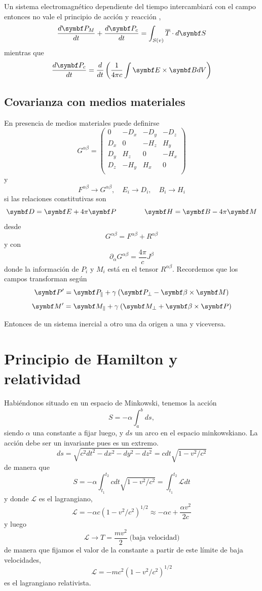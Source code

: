 \documentclass[10pt,oneside]{CBFT_book}
\begin{document}
Un sistema electromagnético dependiente del tiempo intercambiará  con el campo entonces no vale el
principio de acción y reacción ,
\[
	\dtot{\vb{P}_M}{t} + \dtot{\vb{P}_c}{t} = \int_{S(v)} \overline{T}\cdot d\vb{S}
\]
mientras que 
\[
	\dtot{\vb{P}_c}{t} = \dtot{}{t} \left( \frac{1}{4\pi c} \int \pv{E}{B} dV \right)
\]

\subsection{Covarianza con medios materiales}

En presencia de medios materiales puede definirse
\[
	G^{\alpha\beta} =
	\begin{pmatrix}
	 0 & -D_x & -D_y & -D_z \\
	 D_x & 0 & -H_z & H_y \\
	 D_y & H_z & 0 & -H_x \\
	 D_z & -H_y & H_x & 0 \\
	\end{pmatrix}
\]
y 
\[
	F^{\alpha\beta} \to G^{\alpha\beta}, \quad E_i \to D_i, \quad B_i \to H_i
\]
si las relaciones constitutivas son 
\[
	\vb{D} = \vb{E} + 4\pi\vb{P} \qquad\qquad \vb{H} = \vb{B} - 4\pi\vb{M}
\]
desde 
\[
	G^{\alpha\beta} = F^{\alpha\beta} + R^{\alpha\beta}
\]
y con 
\[
	\partial_\alpha G^{\alpha\beta} = \frac{4\pi}{c} J^\beta
\]
donde la información de $P_i$ y $M_i$ está en el tensor $R^{\alpha\beta}$.
Recordemos que los campos transforman según 
\[
	\vb{P}' = \vb{P}_\parallel + \gamma \: ( \vb{P}_\perp  - \pv{\beta}{M} )
\]
\[
	\vb{M}' = \vb{M}_\parallel + \gamma \: ( \vb{M}_\perp  + \pv{\beta}{P} )
\]

Entonces de un sistema inercial a otro una  da origen a una  y viceversa.

\section{Principio de Hamilton y relatividad}

Habiéndonos situado en un espacio de Minkowski, tenemos la acción
\[
	S = -\alpha \int_a^b ds,
\]
siendo $\alpha$ una constante a fijar luego, y $ds$ un arco en el espacio minkowskiano. La acción debe ser 
un invariante pues es un extremo.
\[
	ds = \sqrt{ c^2 dt^2 - dx^2 - dy^2 - dz^2 } = c dt \sqrt{ 1 - v^2/c^2 }
\]
de manera que 
\[
	S = -\alpha \int_{t_1}^{t_2} c dt  \sqrt{ 1 - v^2/c^2 } = \int_{t_1}^{t_2} \mathcal{L} dt
\]
y donde $\mathcal{L}$ es el lagrangiano, 
\[
	\mathcal{L} = -\alpha c \left( 1 - v^2/c^2 \right)^{1/2} \approx -\alpha c + \frac{\alpha v^2}{2c}
\]
y luego 
\[
	\mathcal{L} \to T = \frac{m v^2}{2} \; \text{(baja velocidad)}
\]
de manera que fijamos el valor de la constante a partir de este límite de baja velocidades,
\[
	\mathcal{L} = -m c^2 \left( 1 - v^2/c^2 \right)^{1/2}
\]
es el lagrangiano relativista.
\end{document}
